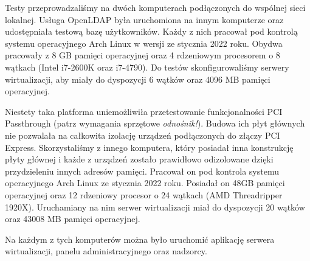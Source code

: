\documentclass[../analiza-rozwiazania.tex]{subfiles}
\begin{document}
Testy przeprowadzaliśmy na dwóch komputerach podłączonych do wspólnej sieci lokalnej.
Usługa OpenLDAP była uruchomiona na innym komputerze oraz udostępniała testową bazę użytkowników.
Każdy z nich pracował pod kontrolą systemu operacyjnego Arch Linux w wersji ze stycznia 2022 roku.
Obydwa pracowały z 8 GB pamięci operacyjnej oraz 4 rdzeniowym procesorem o 8 wątkach (Intel i7-2600K oraz i7-4790).
Do testów skonfigurowaliśmy serwery wirtualizacji, aby miały do dyspozycji 6 wątków oraz 4096 MB pamięci operacyjnej.

Niestety taka platforma uniemożliwiła przetestowanie funkcjonalności PCI Passthrough (patrz wymagania sprzętowe \textit{odnośnik!}).
Budowa ich płyt głównych nie pozwalała na całkowita izolację urządzeń podłączonych do złączy PCI Express.
Skorzystaliśmy z innego komputera, który posiadał inna konstrukcję płyty głównej i każde z urządzeń zostało prawidłowo odizolowane dzięki przydzieleniu innych adresów pamięci.
Pracował on pod kontrola systemu operacyjnego Arch Linux ze stycznia 2022 roku.
Posiadał on 48GB pamięci operacyjnej oraz 12 rdzeniowy procesor o 24 wątkach (AMD Threadripper 1920X).
Uruchamiany na nim serwer wirtualizacji miał do dyspozycji 20 wątków oraz 43008 MB pamięci operacyjnej.

Na każdym z tych komputerów można było uruchomić aplikację serwera wirtualizacji, panelu administracyjnego oraz nadzorcy.
\end{document}
